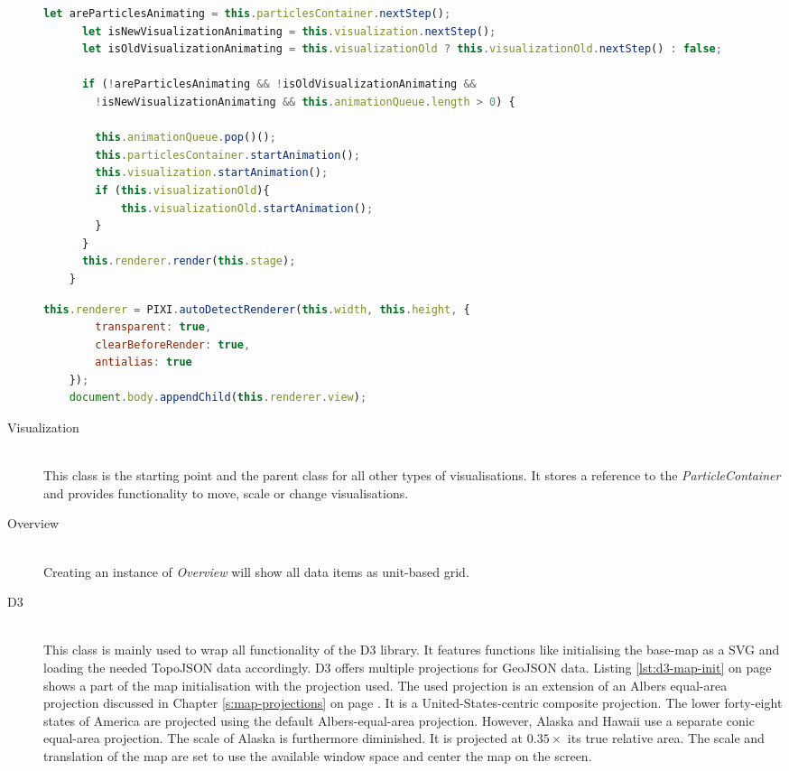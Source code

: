 \begin{description}
\begin{lstlisting}[language=JavaScript, caption={Render function of the canvas class.}, label={lst:canvas-render}]
      let areParticlesAnimating = this.particlesContainer.nextStep();
      let isNewVisualizationAnimating = this.visualization.nextStep();
      let isOldVisualizationAnimating = this.visualizationOld ? this.visualizationOld.nextStep() : false;

      if (!areParticlesAnimating && !isOldVisualizationAnimating &&
        !isNewVisualizationAnimating && this.animationQueue.length > 0) {

        this.animationQueue.pop()();
        this.particlesContainer.startAnimation();
        this.visualization.startAnimation();
        if (this.visualizationOld){
            this.visualizationOld.startAnimation();
        }
      }
      this.renderer.render(this.stage);
    }
\end{lstlisting}

\begin{lstlisting}[language=JavaScript, caption={Pixi's autodetect-renderer.}, label={lst:canvas-autodecet-renderer}]
    this.renderer = PIXI.autoDetectRenderer(this.width, this.height, {
        transparent: true,
        clearBeforeRender: true,
        antialias: true
    });
    document.body.appendChild(this.renderer.view);
\end{lstlisting}

\item[Visualization] \hfill \\
This class is the starting point and the parent class for all other types of visualisations. It stores a reference to the \textit{ParticleContainer} and provides functionality to move, scale or change visualisations.

\item[Overview] \hfill \\
Creating an instance of \textit{Overview} will show all data items as unit-based grid.

\item[D3] \hfill \\
This class is mainly used to wrap all functionality of the \ac{D3} library. It features functions like initialising the base-map as a \ac{SVG} and loading the needed TopoJSON data accordingly. \ac{D3} offers multiple projections for GeoJSON data. Listing \ref{lst:d3-map-init} on page \pageref{lst:d3-map-init} shows a part of the map initialisation with the projection used. The used projection is an extension of an Albers equal-area projection discussed in Chapter \ref{s:map-projections} on page \pageref{s:albers-equal-area-projection}. It is a United-States-centric composite projection. The lower forty-eight states of America are projected using the default Albers-equal-area projection. However, Alaska and Hawaii use a separate conic equal-area projection. The scale of Alaska is furthermore diminished. It is projected at $0.35\times$ its true relative area. The scale and translation of the map are set to use the available window space and center the map on the screen.


\end{description}
